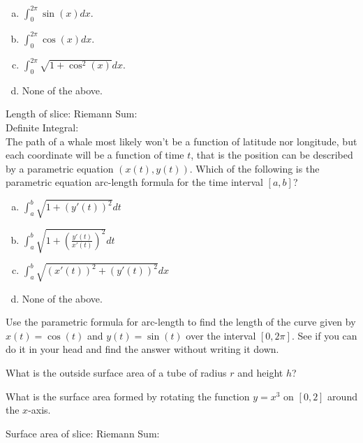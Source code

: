 \documentclass[answers]{exam}
\begin{document}
\begin{questions}
\begin{enumerate}[(a)]
	\item $\displaystyle \int_0^{2\pi}\sin(x)dx.$ 
	\item $\displaystyle \int_0^{2\pi}\cos(x)dx.$  
	\item $\displaystyle \int_0^{2\pi}\sqrt{1+\cos^2(x)} dx.$
	\item None of the above.	
\end{enumerate}

Length of slice: \hspace{2in} Riemann Sum:\\

Definite Integral: \\



\question The path of a whale most likely won't be a function of latitude nor longitude, but each coordinate will be a function of time $t$, that is the position can be described by a parametric equation $(x(t), y(t))$. Which of the following is the parametric equation arc-length formula for the time interval $[a, b]$?

\begin{enumerate}[(a)]
\item $\displaystyle \int_a^b \sqrt{1+\left(y'(t)\right)^2}dt$
\item $\displaystyle \int_a^b \sqrt{1+\left(\frac{y'(t)}{x'(t)}\right)^2}dt$
\item $\displaystyle \int_a^b \sqrt{\left(x'(t)\right)^2+\left(y'(t)\right)^2}dx$
\item None of the above.
\end{enumerate}

\hfill \break
\hfill \break

\question Use the parametric formula for arc-length to find the length of the curve given by $x(t) = \cos(t)$ and $y(t) = \sin(t)$ over the interval $[0, 2\pi]$. See if you can do it in your head and find the answer without writing it down.

\hfill \break
\hfill \break
\hfill \break
\hfill \break


\question What is the outside surface area of a tube of radius $r$ and height $h$?

\hfill \break
\hfill \break
\hfill \break
\hfill \break

\question What is the surface area formed by rotating the function $y = x^3$ on $[0, 2]$ around the $x$-axis.

Surface area of slice: \hspace{2in} Riemann Sum:\\


\end{questions}
\end{document}
